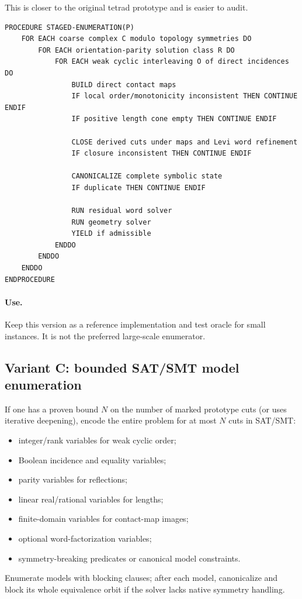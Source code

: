 \documentclass[11pt]{article}
\begin{document}
This is closer to the original tetrad prototype and is easier to audit.

\begin{lstlisting}[caption={Staged baseline algorithm.}]
PROCEDURE STAGED-ENUMERATION(P)
    FOR EACH coarse complex C modulo topology symmetries DO
        FOR EACH orientation-parity solution class R DO
            FOR EACH weak cyclic interleaving O of direct incidences DO
                BUILD direct contact maps
                IF local order/monotonicity inconsistent THEN CONTINUE ENDIF
                IF positive length cone empty THEN CONTINUE ENDIF

                CLOSE derived cuts under maps and Levi word refinement
                IF closure inconsistent THEN CONTINUE ENDIF

                CANONICALIZE complete symbolic state
                IF duplicate THEN CONTINUE ENDIF

                RUN residual word solver
                RUN geometry solver
                YIELD if admissible
            ENDDO
        ENDDO
    ENDDO
ENDPROCEDURE
\end{lstlisting}

\paragraph{Use.}
Keep this version as a reference implementation and test oracle for small instances.  It is not the preferred large-scale enumerator.

\subsection{Variant C: bounded SAT/SMT model enumeration}

If one has a proven bound $N$ on the number of marked prototype cuts (or uses iterative deepening), encode the entire problem for at most $N$ cuts in SAT/SMT:
\begin{itemize}
  \item integer/rank variables for weak cyclic order;
  \item Boolean incidence and equality variables;
  \item parity variables for reflections;
  \item linear real/rational variables for lengths;
  \item finite-domain variables for contact-map images;
  \item optional word-factorization variables;
  \item symmetry-breaking predicates or canonical model constraints.
\end{itemize}
Enumerate models with blocking clauses; after each model, canonicalize and block its whole equivalence orbit if the solver lacks native symmetry handling.
\end{document}
